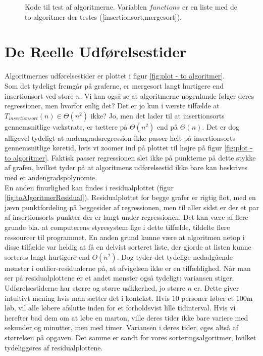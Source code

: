 \begin{figure}
	\begin{center}
		
	\end{center}
	\caption{Kode til test af algoritmerne. Variablen $functions$ er en liste med de to algoritmer der testes ([insertionsort,mergesort]).}
	\label{fig:Kode til test af algoritmerne}
\end{figure}



\section{De Reelle Udførelsestider}
\label{sec:De Reelle Køretider}

Algoritmernes udførelsestider er plottet i figur \ref{fig:plot - to algoritmer}.\\

Som det tydeligt fremgår på graferne, er mergesort langt hurtigere end insertionsort ved store $n$. Vi kan også se at algoritmerne nogenlunde følger deres regressioner, men hvorfor enlig det? Det er jo kun i værste tilfælde at $T_{insertionsort}(n) \in \Theta (n^2)$ ikke? Jo, men det lader til at insertionsorts gennemsnitlige vækstrate, er tættere på $\Theta (n^2)$ end på $\Theta (n)$. Det er dog alligevel tydeligt at andengradsregression ikke passer helt på insertionsorts gennemsnitlige køretid, hvis vi zoomer ind på plottet til højre på figur \ref{fig:plot - to algoritmer}. Faktisk passer regressionen slet ikke på punkterne på dette stykke af grafen, hvilket tyder på at algoritmens udførelsestid ikke bare kan beskrives med et andengradspolynomie.  \\

En anden finurlighed kan findes i residualplottet (figur \ref{fig:toAlgoritmerResidual}). Residualplottet for begge grafer er rigtig flot, med en jævn punktfordeling på beggesider af regressionen, men til aller sidst er der et par af insertionsorts punkter der er langt under regressionen. Det kan være af flere grunde bla. at computerens styresystem lige i dette tilfælde, tildelte flere ressourcer til programmet. En anden grund kunne være at algoritmen netop i disse tilfælde var heldig at få en delvist sorteret liste, der gjorde at listen kunne sorteres langt hurtigere end $O(n^2)$. Dog tyder det tydelige nedadgående mønster i outlier-residualerne på, at afvigelsen ikke er en tilfældighed. Når man ser på residualplottene er et andet mønster også tydeligt: variansen stiger. Udførelsestiderne har større og større usikkerhed, jo større $n$ er. Dette giver intuitivt mening hvis man sætter det i kontekst. Hvis $10$ personer løber et $100$m løb, vil alle løbere afslutte inden for et forholdsvist lille tidinterval. Hvis vi herefter bad dem om at løbe en marton, ville deres tider ikke bare variere med sekunder og minutter, men med timer. Variansen i deres tider, øges altså af størrelsen på opgaven. Det samme er sandt for vores sorteringsalgoritmer, hvilket tydeliggøres af residualplottene. 


